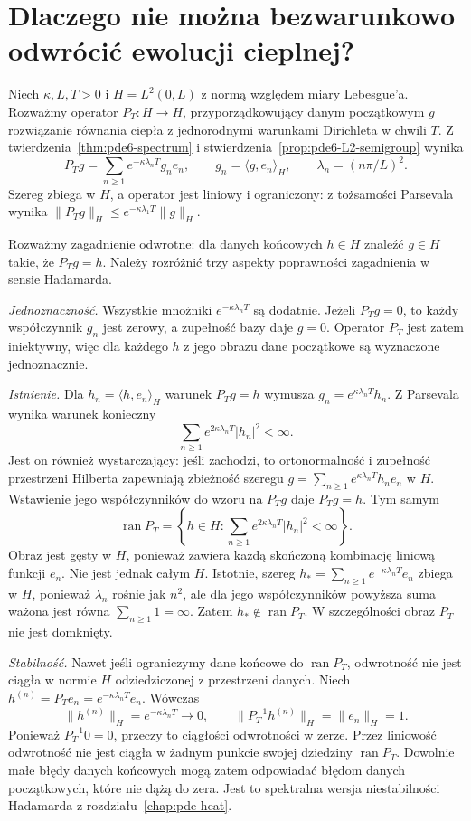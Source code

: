 \section{Dlaczego nie można bezwarunkowo odwrócić ewolucji cieplnej?}
\label{sec:pde6-backward}

Niech $\kappa,L,T>0$ i $H=L^2(0,L)$ z normą względem
miary Lebesgue'a. Rozważmy operator $P_T:H\to H$,
przyporządkowujący danym początkowym $g$ rozwiązanie
równania ciepła z jednorodnymi warunkami Dirichleta
w chwili $T$. Z twierdzenia~\ref{thm:pde6-spectrum}
i stwierdzenia~\ref{prop:pde6-L2-semigroup} wynika
\[
 P_Tg=\sum_{n\ge1} e^{-\kappa\lambda_nT}g_ne_n,\qquad
 g_n=\langle g,e_n\rangle_H,\qquad
 \lambda_n=(n\pi/L)^2.
\]
Szereg zbiega w $H$, a operator jest liniowy i ograniczony:
z tożsamości Parsevala wynika
$\|P_Tg\|_H\le e^{-\kappa\lambda_1T}\|g\|_H$.

Rozważmy zagadnienie odwrotne: dla danych końcowych
$h\in H$ znaleźć $g\in H$ takie, że $P_Tg=h$.
Należy rozróżnić trzy aspekty poprawności zagadnienia
w sensie Hadamarda.

\emph{Jednoznaczność.}
Wszystkie mnożniki $e^{-\kappa\lambda_nT}$ są dodatnie.
Jeżeli $P_Tg=0$, to każdy współczynnik $g_n$ jest zerowy,
a zupełność bazy daje $g=0$. Operator $P_T$ jest zatem
iniektywny, więc dla każdego $h$ z jego obrazu dane
początkowe są wyznaczone jednoznacznie.

\emph{Istnienie.}
Dla $h_n=\langle h,e_n\rangle_H$ warunek $P_Tg=h$
wymusza $g_n=e^{\kappa\lambda_nT}h_n$.
Z Parsevala wynika warunek konieczny
\[
 \sum_{n\ge1} e^{2\kappa\lambda_nT}|h_n|^2<\infty.
\]
Jest on również wystarczający: jeśli zachodzi,
to ortonormalność i zupełność przestrzeni Hilberta
zapewniają zbieżność szeregu
$g=\sum_{n\ge1}e^{\kappa\lambda_nT}h_ne_n$ w $H$.
Wstawienie jego współczynników do wzoru na $P_Tg$
daje $P_Tg=h$. Tym samym
\[
 \operatorname{ran}P_T
 =\left\{h\in H:
 \sum_{n\ge1}e^{2\kappa\lambda_nT}|h_n|^2<\infty\right\}.
\]
Obraz jest gęsty w $H$, ponieważ zawiera każdą skończoną
kombinację liniową funkcji $e_n$.
Nie jest jednak całym $H$. Istotnie, szereg
$h_*=\sum_{n\ge1}e^{-\kappa\lambda_nT}e_n$
zbiega w $H$, ponieważ $\lambda_n$ rośnie jak $n^2$,
ale dla jego współczynników powyższa suma
ważona jest równa $\sum_{n\ge1}1=\infty$.
Zatem $h_*\notin\operatorname{ran}P_T$.
W szczególności obraz $P_T$ nie jest domknięty.

\emph{Stabilność.}
Nawet jeśli ograniczymy dane końcowe do
$\operatorname{ran}P_T$, odwrotność nie jest ciągła
w normie $H$ odziedziczonej z przestrzeni danych.
Niech $h^{(n)}=P_Te_n=e^{-\kappa\lambda_nT}e_n$.
Wówczas
\[
 \|h^{(n)}\|_H=e^{-\kappa\lambda_nT}\longrightarrow0,
 \qquad
 \|P_T^{-1}h^{(n)}\|_H=\|e_n\|_H=1.
\]
Ponieważ $P_T^{-1}0=0$, przeczy to ciągłości
odwrotności w zerze. Przez liniowość odwrotność nie
jest ciągła w żadnym punkcie swojej dziedziny $\operatorname{ran}P_T$.
Dowolnie małe błędy danych końcowych mogą zatem
odpowiadać błędom danych początkowych, które nie
dążą do zera. Jest to spektralna wersja
niestabilności Hadamarda z rozdziału~\ref{chap:pde-heat}.

